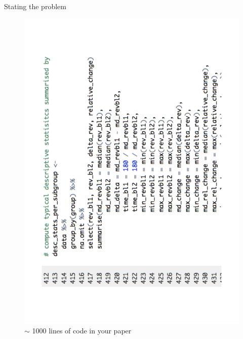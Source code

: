 \documentclass[final,hyperref={pdfpagelabels=false}]{beamer}
\begin{document}
\begin{frame}{}
\begin{columns}[t]
\begin{column}{.48\linewidth}
      
         \begin{block}{Stating the problem}
         \begin{minipage}[t]{0.40\textwidth}
         \begin{figure}[ht]
             \centering
             \includegraphics[valign=T,scale=.4, angle=270]{logo/rcode_example}
             \caption{$\sim$ 1000 lines of code in your paper} 
          \end{figure}
          \end{minipage}
          \begin{minipage}[t]{0.55\textwidth}
          \begin{figure}[ht]
             \centering

\end{figure}
\end{minipage}
\end{block}
\end{column}
\end{columns}
\end{frame}
\end{document}
